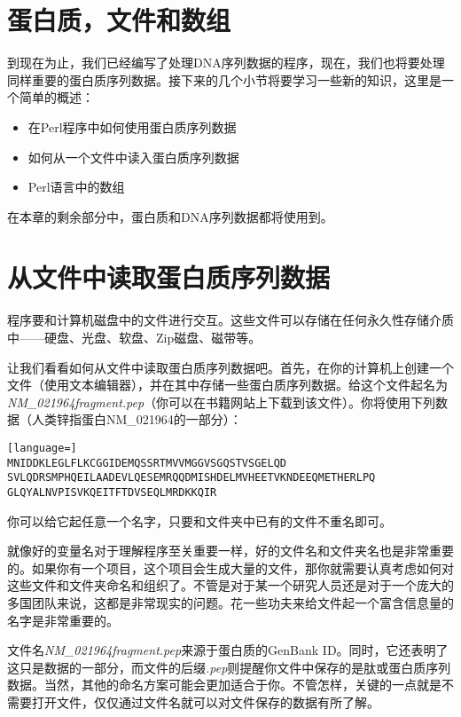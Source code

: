 \section{蛋白质，文件和数组}
到现在为止，我们已经编写了处理DNA序列数据的程序，现在，我们也将要处理同样重要的蛋白质序列数据。接下来的几个小节将要学习一些新的知识，这里是一个简单的概述：

\begin{itemize}
  \item 在Perl程序中如何使用蛋白质序列数据
  \item 如何从一个文件中读入蛋白质序列数据
  \item Perl语言中的数组
\end{itemize}

在本章的剩余部分中，蛋白质和DNA序列数据都将使用到。

\section{从文件中读取蛋白质序列数据}
程序要和计算机磁盘中的文件进行交互。这些文件可以存储在任何永久性存储介质中——硬盘、光盘、软盘、Zip磁盘、磁带等。

让我们看看如何从文件中读取蛋白质序列数据吧。首先，在你的计算机上创建一个文件（使用文本编辑器），并在其中存储一些蛋白质序列数据。给这个文件起名为\textit{NM\_021964fragment.pep}（你可以在书籍网站上下载到该文件）。你将使用下列数据（人类锌指蛋白NM\_021964的一部分）：

\begin{lstlisting}[language=]
MNIDDKLEGLFLKCGGIDEMQSSRTMVVMGGVSGQSTVSGELQD
SVLQDRSMPHQEILAADEVLQESEMRQQDMISHDELMVHEETVKNDEEQMETHERLPQ
GLQYALNVPISVKQEITFTDVSEQLMRDKKQIR
\end{lstlisting}

你可以给它起任意一个名字，只要和文件夹中已有的文件不重名即可。

就像好的变量名对于理解程序至关重要一样，好的文件名和文件夹名也是非常重要的。如果你有一个项目，这个项目会生成大量的文件，那你就需要认真考虑如何对这些文件和文件夹命名和组织了。不管是对于某一个研究人员还是对于一个庞大的多国团队来说，这都是非常现实的问题。花一些功夫来给文件起一个富含信息量的名字是非常重要的。

文件名\textit{NM\_021964fragment.pep}来源于蛋白质的GenBank
ID。同时，它还表明了这只是数据的一部分，而文件的后缀\textit{.pep}则提醒你文件中保存的是肽或蛋白质序列数据。当然，其他的命名方案可能会更加适合于你。不管怎样，关键的一点就是不需要打开文件，仅仅通过文件名就可以对文件保存的数据有所了解。

